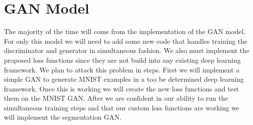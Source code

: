 \section{GAN Model}
The majority of the time will come from the implementation of the GAN model. For only this model we will need to add some new code that handles training the discriminator and generator in simultaneous fashion. We also must implement the proposed loss functions since they are not build into any existing deep learning framework. We plan to attack this problem in steps. First we will implement a simple GAN to generate MNIST examples in a too be determined deep learning framework. Once this is working we will create the new loss functions and test them on the MNIST GAN. After we are confident in our ability to run the simultaneous training steps and that our custom loss functions are working we will implement the segmentation GAN.